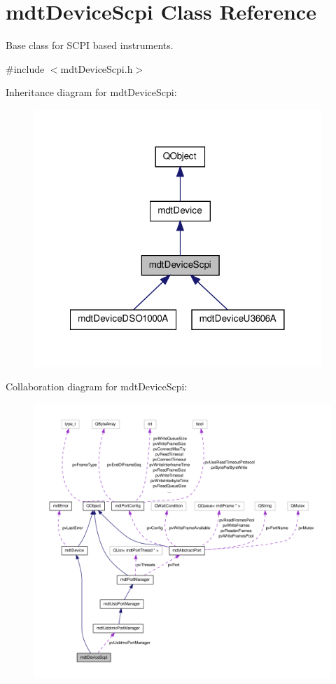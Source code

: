 \hypertarget{classmdt_device_scpi}{\section{mdt\-Device\-Scpi Class Reference}
\label{classmdt_device_scpi}
}


Base class for S\-C\-P\-I based instruments.  




{\ttfamily \#include $<$mdt\-Device\-Scpi.\-h$>$}



Inheritance diagram for mdt\-Device\-Scpi\-:\nopagebreak
\begin{figure}[H]
\begin{center}
\leavevmode
\includegraphics[width=308pt]{classmdt_device_scpi__inherit__graph}
\end{center}
\end{figure}


Collaboration diagram for mdt\-Device\-Scpi\-:
\nopagebreak
\begin{figure}[H]
\begin{center}
\leavevmode
\includegraphics[width=350pt]{classmdt_device_scpi__coll__graph}
\end{center}
\end{figure}
